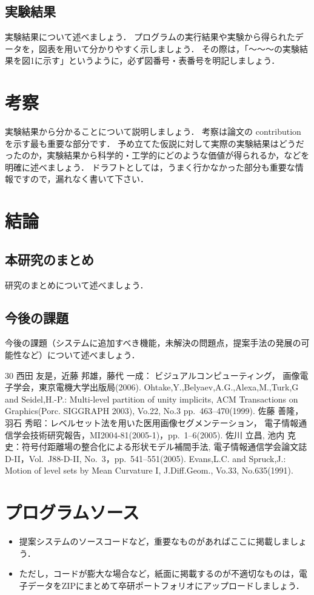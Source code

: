 \documentclass[uplatex,draft]{ipsjpapers}
\begin{document}
\subsection{実験結果}
実験結果について述べましょう．
プログラムの実行結果や実験から得られたデータを，図表を用いて分かりやすく示しましょう．
その際は，「～～～の実験結果を図1に示す」というように，必ず図番号・表番号を明記しましょう．
%
\section{考察}
\label{sec:discussion}
実験結果から分かることについて説明しましょう．
考察は論文の contribution を示す最も重要な部分です．
予め立てた仮説に対して実際の実験結果はどうだったのか，実験結果から科学的・工学的にどのような価値が得られるか，などを明確に述べましょう．
ドラフトとしては，うまく行かなかった部分も重要な情報ですので，漏れなく書いて下さい．
%
%
\section{結論}
\label{sec:conclusion}
\subsection{本研究のまとめ}
研究のまとめについて述べましょう．
%
\subsection{今後の課題}
今後の課題（システムに追加すべき機能，未解決の問題点，提案手法の発展の可能性など）について述べましょう．
%
%
\begin{thebibliography} {30}
%
%
西田 友是，近藤 邦雄，藤代 一成：
ビジュアルコンピューティング，
画像電子学会，東京電機大学出版局(2006).
%
Ohtake,Y.,Belyaev,A.G.,Alexa,M.,Turk,G and Seidel,H.-P.:
Multi-level partition of unity implicits,
ACM Transactions on Graphics(Porc. SIGGRAPH 2003),
Vo.22, No.3 pp.\ 463--470(1999).
%
佐藤 善隆，羽石 秀昭：レベルセット法を用いた医用画像セグメンテーション，
電子情報通信学会技術研究報告，MI2004-81(2005-1)，pp.\ 1--6(2005).
%
佐川 立昌, 池内 克史：符号付距離場の整合化による形状モデル補間手法,
電子情報通信学会論文誌 D-II，Vol.~J88-D-II, No.~3，pp.\ 541--551(2005).
%
Evans,L.C. and Spruck,J.:
Motion of level sets by Mean Curvature I,
J.Diff.Geom., Vo.33, No.635(1991).
%
%
%
\end{thebibliography}
%
%
%
%
%
%
\appendix
\section{プログラムソース}
\begin{itemize}
\item 提案システムのソースコードなど，重要なものがあればここに掲載しましょう．
\item ただし，コードが膨大な場合など，紙面に掲載するのが不適切なものは，電子データをZIPにまとめて卒研ポートフォリオにアップロードしましょう．
\end{itemize}
%
\end{document}
